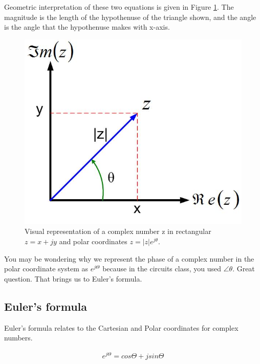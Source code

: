 \documentclass{ximera}
\begin{document}
Geometric interpretation of these two equations is given in Figure \ref{wind}. The magnitude is the length of the hypothenuse of the triangle shown, and the angle is the angle that the hypothenuse makes with x-axis. 
\begin{figure}[htbp]
\begin{center}
\includegraphics[scale=0.3]{../jpg/Complex_Numbersz12.jpg}
\end{center}
\caption{Visual representation of a complex number z in rectangular $z=x+jy$ and polar coordinates $z=|z|e^{j \theta}$.}
\label{wind}
\end{figure}




You may be wondering why we represent the phase of a complex number in the polar coordinate system as  $e^{j \Theta}$ because in the circuits class, you used $ \angle \theta $. Great question. That brings us to Euler's formula.

  
 \subsection{Euler's formula} 
  
  

 Euler's formula relates to the Cartesian and Polar coordinates for complex numbers.

\begin{eqnarray}
e^{j \Theta} = cos \Theta + j sin \Theta
\end{eqnarray}
\end{document}
